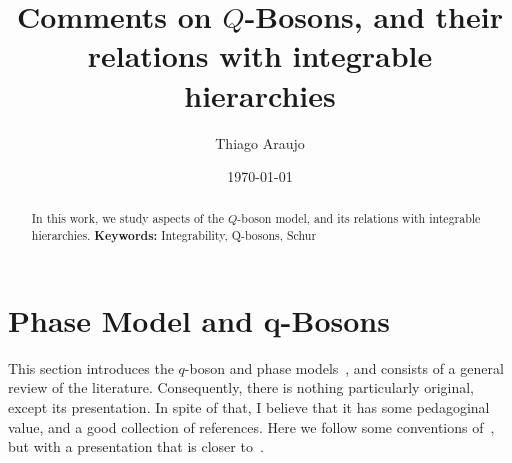 \documentclass[a4paper,11pt]{amsart}
\begin{document}

\title[\(Q\)-Bosons and relations with integrable hierarchies]{Comments on \(Q\)-Bosons,
and their relations with integrable hierarchies}

\author{Thiago Araujo}

\address{\noindent 
Instituto de Física Teórica, UNESP-Universidade Estadual Paulista
R. Dr. Bento T. Ferraz 271, Bl. II, Sao Paulo 01140-070, SP, Brazil\\
and
Instituto de Física\\ Universidade de S\~ao Paulo\\ 
Rua do Matão Travessa 1371, 05508-090\\ São Paulo, SP. Brazil
}


\begin{abstract}
In this work, we study aspects of the \(Q\)-boson model, and 
its relations with integrable hierarchies. 
\vspace{4pt}
\noindent \textbf{Keywords:} Integrability, Q-bosons, Schur

\date{\today}

\end{abstract}

\maketitle

\setcounter{tocdepth}{3}
\tableofcontents

\section{Phase Model and q-Bosons}

This section introduces the \(q\)-boson and phase
models~\cite{Bogoliubov:1992, Bogoliubov:1997soj, Bogoliubov2005,
  Bogoliubov:1997soj, Tsilevich:2006}, and consists of a general
review of the literature. Consequently, there is nothing particularly
original, except its presentation.  In spite of that, I believe that
it has some pedagoginal value, and a good collection of references.
Here we follow some conventions of~\cite{Wheeler:2010vmq}, but with a
presentation that is closer to~\cite{Tsilevich:2006}.
\end{document}
